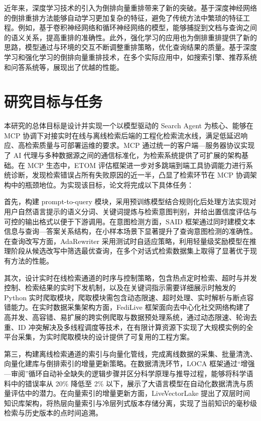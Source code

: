 近年来，深度学习技术的引入为倒排向量重排带来了新的突破。基于深度神经网络的倒排重排方法能够自动学习更加复杂的特征，避免了传统方法中繁琐的特征工程。例如，基于卷积神经网络和循环神经网络的模型，能够捕捉到文档与查询之间的语义关系，提高重排的准确性。此外，强化学习的应用也为倒排重排提供了新的思路，模型通过与环境的交互不断调整重排策略，优化查询结果的质量。基于深度学习和强化学习的倒排向量重排技术，在多个实际应用中，如搜索引擎、推荐系统和问答系统等，展现出了优越的性能。
\section{研究目标与任务} 
本研究的总体目标是设计并实现一个以模型驱动的 Search Agent 为核心、能够在 MCP 协调下对接实时在线与离线检索后端的工程化检索流水线，满足低延迟响应、高检索质量与可部署运维的要求。MCP 通过统一的客户端—服务器协议实现了 AI 代理与多种数据源之间的通信标准化，为检索系统提供了可扩展的架构基础\cite{sun2025symbioticragenhancingdocumentintelligence}。在 MCP 生态中，ETOM 评估框架进一步对多跳端到端工具协调能力进行系统诊断，发现检索错误占所有失败原因的近一半，凸显了检索环节在 MCP 协调架构中的瓶颈地位\cite{Dong2025ETOMAF}。为实现该目标，论文将完成以下具体任务：

首先，构建 prompt-to-query 模块，采用预训练模型结合规则化后处理方法实现对用户自然语言提示的语义分词、关键词提炼与检索意图判别，并给出置信度评估与可控的输出格式以便于下游调用。在意图检测方面，SAID 框架通过同时建模文本信息与查询—答案关系结构，在小样本场景下显著提升了查询意图检测的准确性。在查询改写方面，AdaRewriter 采用测试时自适应策略，利用轻量级奖励模型在推理阶段从候选改写中筛选最优查询，在多个对话式检索数据集上取得了显著优于现有方法的性能\cite{lai2025adarewriterunleashingpowerpromptingbased}。

其次，设计实时在线检索通道的时序与控制策略，包含热点定时检索、超时与并发控制、检索结果的实时下发机制，以及在关键词指示需要详细展示时触发的 Python 实时爬取模块，爬取模块需包含动态限速、超时处理、实时解析与断点容错能力。在实时数据采集架构方面，FediLive 框架面向去中心化社交网络构建了高并发、高容错、易扩展的跨实例爬取与数据预处理系统，通过动态限速、轮询去重、ID 冲突解决及多线程调度等技术，在有限计算资源下实现了大规模实例的全平台采集，为实时爬取模块的设计提供了可复用的工程方案。

第三，构建离线检索通道的索引与向量化管线，完成离线数据的采集、批量清洗、向量化建库与倒排索引的增量更新策略。在数据清洗环节，LOCA 框架通过“增强—审阅”循环自动补全缺失的逻辑步骤并区分科学原理与推导过程，能够将科学语料中的错误率从 20\% 降低至 2\% 以下，展示了大语言模型在自动化数据清洗与质量评估中的潜力\cite{fang2025localogicalchainaugmentation}。在向量索引的增量更新方面，LiveVectorLake 提出了双层时间知识库架构，将热层向量索引与冷层列式版本存储分离，实现了当前知识的毫秒级检索与历史版本的点时间追溯。


